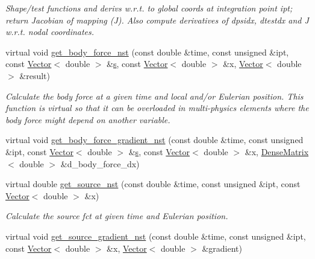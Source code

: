 \begin{DoxyCompactItemize}
\begin{DoxyCompactList}\small\item\em Shape/test functions and derivs w.\+r.\+t. to global coords at integration point ipt; return Jacobian of mapping (J). Also compute derivatives of dpsidx, dtestdx and J w.\+r.\+t. nodal coordinates. \end{DoxyCompactList}\item 
virtual void \hyperlink{classoomph_1_1NavierStokesEquations_a8a3f44daab0e804f2d9b03ab9a962440}{get\+\_\+body\+\_\+force\+\_\+nst} (const double \&time, const unsigned \&ipt, const \hyperlink{classoomph_1_1Vector}{Vector}$<$ double $>$ \&\hyperlink{cfortran_8h_ab7123126e4885ef647dd9c6e3807a21c}{s}, const \hyperlink{classoomph_1_1Vector}{Vector}$<$ double $>$ \&x, \hyperlink{classoomph_1_1Vector}{Vector}$<$ double $>$ \&result)
\begin{DoxyCompactList}\small\item\em Calculate the body force at a given time and local and/or Eulerian position. This function is virtual so that it can be overloaded in multi-\/physics elements where the body force might depend on another variable. \end{DoxyCompactList}\item 
virtual void \hyperlink{classoomph_1_1NavierStokesEquations_a902533453645818bfd1250f532b1005a}{get\+\_\+body\+\_\+force\+\_\+gradient\+\_\+nst} (const double \&time, const unsigned \&ipt, const \hyperlink{classoomph_1_1Vector}{Vector}$<$ double $>$ \&\hyperlink{cfortran_8h_ab7123126e4885ef647dd9c6e3807a21c}{s}, const \hyperlink{classoomph_1_1Vector}{Vector}$<$ double $>$ \&x, \hyperlink{classoomph_1_1DenseMatrix}{Dense\+Matrix}$<$ double $>$ \&d\+\_\+body\+\_\+force\+\_\+dx)
\item 
virtual double \hyperlink{classoomph_1_1NavierStokesEquations_ac2e9128dcc1b15c1b71ec1fa22c181cb}{get\+\_\+source\+\_\+nst} (const double \&time, const unsigned \&ipt, const \hyperlink{classoomph_1_1Vector}{Vector}$<$ double $>$ \&x)
\begin{DoxyCompactList}\small\item\em Calculate the source fct at given time and Eulerian position. \end{DoxyCompactList}\item 
virtual void \hyperlink{classoomph_1_1NavierStokesEquations_a5dfbaf5de472600c889c681cf3d4ffb7}{get\+\_\+source\+\_\+gradient\+\_\+nst} (const double \&time, const unsigned \&ipt, const \hyperlink{classoomph_1_1Vector}{Vector}$<$ double $>$ \&x, \hyperlink{classoomph_1_1Vector}{Vector}$<$ double $>$ \&gradient)

\end{DoxyCompactItemize}
